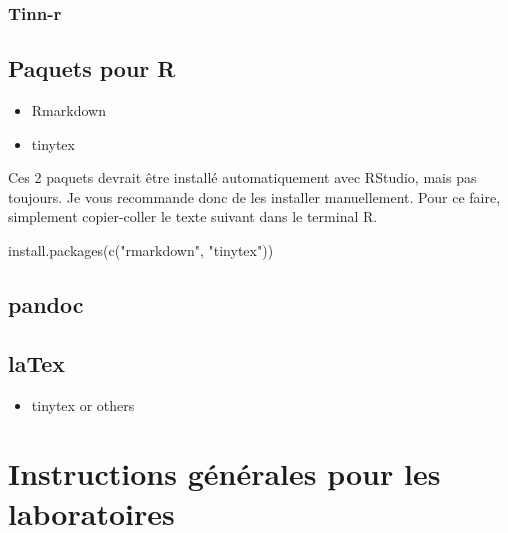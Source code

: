 \documentclass[
  12pt,
]{book}
\newenvironment{Shaded}{\begin{snugshade}}{\end{snugshade}}
\newcommand{\FunctionTok}[1]{\textcolor[rgb]{0.00,0.00,0.00}{#1}}
\newcommand{\NormalTok}[1]{#1}
\newcommand{\StringTok}[1]{\textcolor[rgb]{0.31,0.60,0.02}{#1}}
\providecommand{\tightlist}{%
  \setlength{\itemsep}{0pt}\setlength{\parskip}{0pt}}
\begin{document}
\hypertarget{tinn-r}{%
\subsubsection*{Tinn-r}\label{tinn-r}}

\hypertarget{paquets-pour-r}{%
\subsection*{Paquets pour R}\label{paquets-pour-r}}

\begin{itemize}
\tightlist
\item
  Rmarkdown
\item
  tinytex
\end{itemize}

Ces 2 paquets devrait être installé automatiquement avec RStudio, mais pas toujours. Je vous recommande donc de les installer manuellement. Pour ce faire, simplement copier-coller le texte suivant dans le terminal R.

\begin{Shaded}
\begin{Highlighting}[]
\FunctionTok{install.packages}\NormalTok{(}\FunctionTok{c}\NormalTok{(}\StringTok{"rmarkdown"}\NormalTok{, }\StringTok{"tinytex"}\NormalTok{))}
\end{Highlighting}
\end{Shaded}

\hypertarget{pandoc}{%
\subsection*{pandoc}\label{pandoc}}

\hypertarget{latex}{%
\subsection*{laTex}\label{latex}}

\begin{itemize}
\tightlist
\item
  tinytex
  or others
\end{itemize}

\hypertarget{instructions-guxe9nuxe9rales-pour-les-laboratoires}{%
\section*{Instructions générales pour les laboratoires}\label{instructions-guxe9nuxe9rales-pour-les-laboratoires}}
\end{document}
